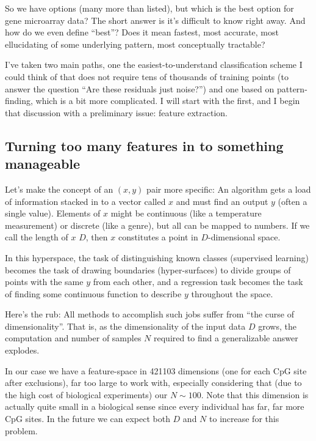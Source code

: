 \documentclass[]{article}
\begin{document}
  So we have options (many more than listed), but which is the best option for gene microarray data? The short answer is it's difficult to know right away. And how do we even define ``best''? Does it mean fastest, most accurate, most ellucidating of some underlying pattern, most conceptually tractable?

  I've taken two main paths, one the easiest-to-understand classification scheme I could think of that does not require tens of thousands of training points (to answer the question ``Are these residuals just noise?'') and one based on pattern-finding, which is a bit more complicated. I will start with the first, and I begin that discussion with a preliminary issue: feature extraction.

  \subsection{Turning too many features in to something manageable}

  Let's make the concept of an $(x,y)$ pair more specific: An algorithm gets a load of information stacked in to a vector called $x$ and must find an output $y$ (often a single value). Elements of $x$ might be continuous (like a temperature measurement) or discrete (like a genre), but all can be mapped to numbers. If we call the length of $x$ $D$, then $x$ constitutes a point in $D$-dimensional space.

  In this hyperspace, the task of distinguishing known classes (supervised learning) becomes the task of drawing boundaries (hyper-surfaces) to divide groups of points with the same $y$ from each other, and a regression task becomes the task of finding some continuous function to describe $y$ throughout the space.

  Here's the rub: All methods to accomplish such jobs suffer from ``the curse of dimensionality''. That is, as the dimensionality of the input data $D$ grows, the computation and number of samples $N$ required to find a generalizable answer explodes.

  In our case we have a feature-space in 421103 dimensions (one for each CpG site after exclusions), far too large to work with, especially considering that (due to the high cost of biological experiments) our $N \sim100$. Note that this dimension is actually quite small in a biological sense since every individual has far, far more CpG sites. In the future we can expect both $D$ and $N$ to increase for this problem.
\end{document}
